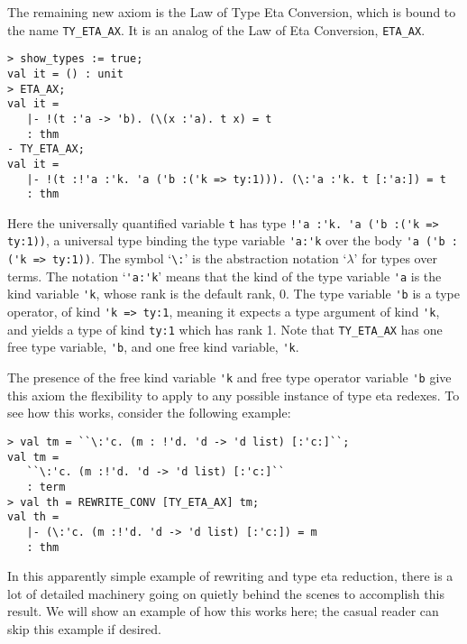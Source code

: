 The remaining new axiom is the Law of Type Eta Conversion, which is bound
to the \ML{} name {\small\verb|TY_ETA_AX|}.
It is an analog of the \HOL{} Law of Eta Conversion, {\small\verb|ETA_AX|}.

\begin{session}
\begin{verbatim}
> show_types := true;
val it = () : unit
> ETA_AX;
val it =
   |- !(t :'a -> 'b). (\(x :'a). t x) = t
   : thm
- TY_ETA_AX;
val it =
   |- !(t :!'a :'k. 'a ('b :('k => ty:1))). (\:'a :'k. t [:'a:]) = t
   : thm
\end{verbatim}
\end{session}

Here the universally quantified variable {\small\verb|t|} has type
{\small\verb|!'a :'k. 'a ('b :('k => ty:1))|}, a universal type binding
the type variable {\small\verb|'a:'k|} over the body
{\small\verb|'a ('b :('k => ty:1))|}.
The symbol `{\small\verb|\:|}' is the abstraction notation `$\lambda$' for
types over terms.  The notation `{\small\verb|'a:'k|}' means that the kind of
the type variable {\small\verb|'a|} is the kind variable {\small\verb|'k|},
whose rank is the default rank, 0.  The type variable {\small\verb|'b|} is a
type operator, of kind {\small\verb|'k => ty:1|}, meaning it expects a type
argument of kind {\small\verb|'k|}, and yields a type of kind
{\small\verb|ty:1|} which has rank 1.  Note that {\small\verb|TY_ETA_AX|}
has one free type variable, {\small\verb|'b|}, and one free kind variable,
{\small\verb|'k|}.

The presence of the free kind variable {\small\verb|'k|} and free type operator
variable {\small\verb|'b|} give this axiom the flexibility to apply to any
possible instance of type eta redexes.  To see how this works, consider the
following example:
%
\begin{session}
\begin{verbatim}
> val tm = ``\:'c. (m : !'d. 'd -> 'd list) [:'c:]``;
val tm =
   ``\:'c. (m :!'d. 'd -> 'd list) [:'c:]``
   : term
> val th = REWRITE_CONV [TY_ETA_AX] tm;
val th =
   |- (\:'c. (m :!'d. 'd -> 'd list) [:'c:]) = m
   : thm
\end{verbatim}
\end{session}

In this apparently simple example of rewriting and type eta reduction,
there is a lot of detailed machinery going on quietly behind the scenes
to accomplish this result.  We will show an example of how this works here;
the casual reader can skip this example if desired.

